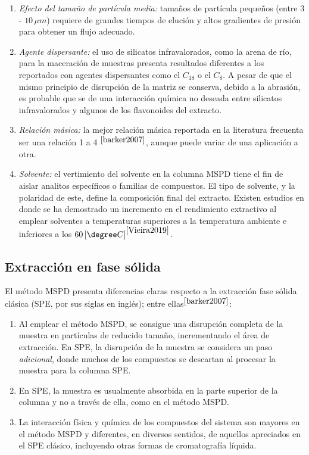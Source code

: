 \begin{enumerate}
	\item \textit{Efecto del tama\~no de part\'icula media:} tama\~nos de part\'icula peque\~nos (entre $3$ - $10 \, \mu m$) requiere de grandes tiempos de eluci\'on y altos gradientes de presi\'on para obtener un flujo adecuado. 
	\item \textit{Agente dispersante:} el uso de silicatos infravalorados, como la arena de r\'io, para la maceraci\'on de muestras presenta resultados diferentes a los reportados con agentes dispersantes como el $C_{18}$ o el $C_8$. A pesar de que el mismo principio de disrupci\'on de la matriz se conserva, debido a la abrasi\'on, es probable que se de una interacci\'on qu\'imica no deseada entre silicatos infravalorados y algunos de los flavonoides del extracto.
	\item \textit{Relaci\'on m\'asica:} la mejor relaci\'on m\'asica reportada en la literatura frecuenta ser una relaci\'on 1 a 4 $^{\cite{barker2007}}$, aunque puede variar de una aplicaci\'on a otra. 
	\item \textit{Solvente:} el vertimiento del solvente en la columna MSPD tiene el fin de aislar analitos espec\'ificos o familias de compuestos. El tipo de solvente, y la polaridad de este, define la composici\'on final del extracto. Existen estudios en donde se ha demostrado un incremento en el rendimiento extractivo al emplear solventes a temperaturas superiores a la temperatura ambiente e inferiores a los $60 \left[ \degree C \right]^{\cite{Vieira2019}}$. 
\end{enumerate}

\subsection{Extracci\'on en fase s\'olida}

\noindent
\justify

El m\'etodo MSPD presenta diferencias claras respecto a la extracci\'on fase s\'olida cl\'asica (SPE, por sus siglas en ingl\'es); entre ellas$^{\cite{barker2007}}$:
\begin{enumerate}
	\item Al emplear el m\'etodo MSPD, se consigue una disrupci\'on completa de la muestra en part\'iculas de reducido tama\~no, incrementando el \'area de extracci\'on. En SPE, la disrupci\'on de la muestra se considera un paso \textit{adicional}, donde muchos de los compuestos se descartan al procesar la muestra para la columna SPE. 
	\item En SPE, la muestra es usualmente absorbida en la parte superior de la columna y no a trav\'es de ella, como en el m\'etodo MSPD.
	\item La interacci\'on f\'isica y qu\'imica de los compuestos del sistema son mayores en el m\'etodo MSPD y diferentes, en diversos sentidos, de aquellos apreciados en el SPE cl\'asico, incluyendo otras formas de cromatograf\'ia l\'iquida.
\end{enumerate}

